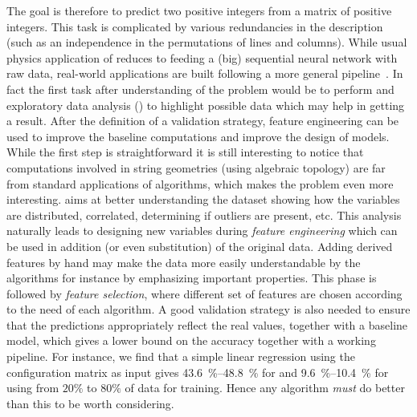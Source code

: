 The goal is therefore to predict two positive integers from a matrix of positive integers.
This task is complicated by various redundancies in the description (such as an independence in the permutations of lines and columns).
While usual physics application of \ml reduces to feeding a (big) sequential neural network with raw data, real-world applications are built following a more general pipeline~\cite{Geron:2019:HandsOnMachineLearning, Skiena:2017:DataScienceDesign}.
In fact the first task after understanding of the problem would be to perform and exploratory data analysis (\eda) to highlight possible data which may help in getting a result.
After the definition of a validation strategy, feature engineering can be used to improve the baseline computations and improve the design of \ml models.
While the first step is straightforward it is still interesting to notice that computations involved in string geometries (using algebraic topology) are far from standard applications of \ml algorithms, which makes the problem even more interesting.
\eda aims at better understanding the dataset showing how the variables are distributed, correlated, determining if outliers are present, etc.
This analysis naturally leads to designing new variables during \emph{feature engineering} which can be used in addition (or even substitution) of the original data.
Adding derived features by hand may make the data more easily understandable by the \ml algorithms for instance by emphasizing important properties.\footnotemark{}
This phase is followed by \emph{feature selection}, where different set of features are chosen according to the need of each algorithm.
A good validation strategy is also needed to ensure that the predictions appropriately reflect the real values, together with a baseline model, which gives a lower bound on the accuracy together with a working pipeline.\footnotemark{}
For instance, we find that a simple linear regression using the configuration matrix as input gives \SIrange{43.6}{48.8}{\percent} for  and \SIrange{9.6}{10.4}{\percent} for  using from $20\%$ to $80\%$ of data for training.
Hence any algorithm \emph{must} do better than this to be worth considering.


